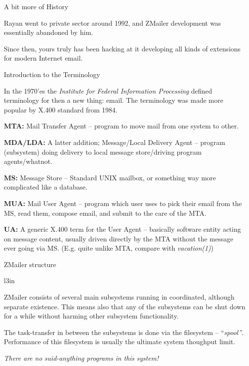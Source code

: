 \documentclass[a4paper,landscape]{slides}
\newcommand{\ZM}{ZMailer}
\begin{document}
\begin{slide}
\centerline{\large A bit more of History}


Rayan went to private sector around 1992, and \ZM{} development
was essentially abandoned by him.

Since then, yours truly has been hacking at it developing all kinds
of extensions for modern Internet email.

\vfill

\end{slide}



\begin{slide}

\centerline{\large Introduction to the Terminology}
\small

In the 1970'es the {\em Institute for Federal Information Processing}
defined terminology for then a new thing: email.
The terminology was made more popular by X.400 standard from 1984.

{\bf MTA:}
Mail Transfer Agent -- program to move mail from one system to other.

{\bf MDA/LDA:}
A latter addition; Message/Local Delivery Agent -- program (subsystem)
doing delivery to local message store/driving program agents/whatnot.

{\bf MS:}
Message Store -- Standard UNIX mailbox, or something way more complicated
like a database.

{\bf MUA:}
Mail User Agent -- program which user uses to pick their email from
the MS, read them, compose email, and submit to the care of the MTA.

{\bf UA:} A generic X.400 term for the User Agent -- basically
software entity acting on message content, usually driven directly
by the MTA without the message ever going via MS.
(E.g. quite unlike MTA, compare with {\em vacation(1)})

\vfill

\end{slide}



\begin{slide}

\centerline{\large \ZM{} structure}

\begin{wrapfigure}[11]{l}{3in}
\end{wrapfigure}

\ZM{} consists of several main subsystems running in coordinated,
although separate existence.  This means also that any of the subsystems
can be shut down for a while without harming other subsystem functionality.

The task-transfer in between the subsystems is done via
the filesystem -- {``\it spool''}.
Performance of this filesystem is usually the ultimate system thoughput limit.

\vfill
\centerline{\em There are no suid-anything programs in this system!}

\vfill

\end{slide}
\end{document}
